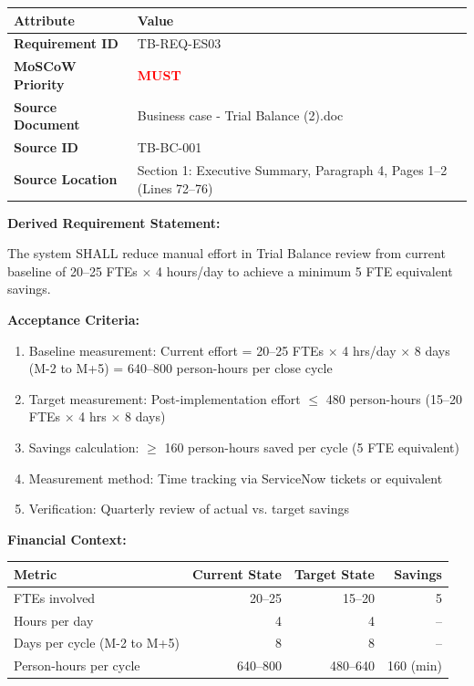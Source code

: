 \documentclass[11pt,a4paper,twoside]{report}
\begin{document}
\begin{tabularx}{\textwidth}{@{}lX@{}}
\toprule
\textbf{Attribute} & \textbf{Value} \\
\midrule
\textbf{Requirement ID} & TB-REQ-ES03 \\
\textbf{MoSCoW Priority} & \textcolor{red}{\textbf{MUST}} \\
\textbf{Source Document} & Business case - Trial Balance (2).doc \\
\textbf{Source ID} & TB-BC-001 \\
\textbf{Source Location} & Section 1: Executive Summary, Paragraph 4, Pages 1--2 (Lines 72--76) \\
\bottomrule
\end{tabularx}

\vspace{0.5em}
\textbf{Derived Requirement Statement:}

The system SHALL reduce manual effort in Trial Balance review from current
baseline of 20--25 FTEs $\times$ 4 hours/day to achieve a minimum 5 FTE
equivalent savings.

\textbf{Acceptance Criteria:}

\begin{tcolorbox}[colback=sapamber!5,colframe=sapamber!70,title=Measurable Acceptance Criteria]
\begin{enumerate}[label=AC-ES03-\arabic*:,leftmargin=*]
\item Baseline measurement: Current effort = 20--25 FTEs $\times$ 4 hrs/day
$\times$ 8 days (M-2 to M+5) = 640--800 person-hours per close cycle
\item Target measurement: Post-implementation effort $\leq$ 480 person-hours
(15--20 FTEs $\times$ 4 hrs $\times$ 8 days)
\item Savings calculation: $\geq$ 160 person-hours saved per cycle (5 FTE equivalent)
\item Measurement method: Time tracking via ServiceNow tickets or equivalent
\item Verification: Quarterly review of actual vs. target savings
\end{enumerate}
\end{tcolorbox}

\textbf{Financial Context:}

\begin{tabular}{lrrr}
\toprule
\textbf{Metric} & \textbf{Current State} & \textbf{Target State} & \textbf{Savings} \\
\midrule
FTEs involved & 20--25 & 15--20 & 5 \\
Hours per day & 4 & 4 & -- \\
Days per cycle (M-2 to M+5) & 8 & 8 & -- \\
Person-hours per cycle & 640--800 & 480--640 & 160 (min) \\
\bottomrule
\end{tabular}
\end{document}
